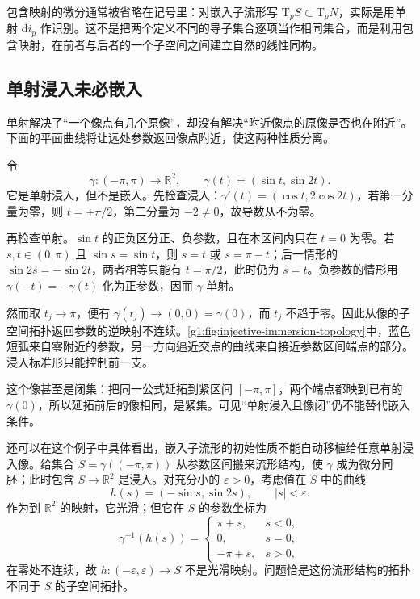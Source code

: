 \ProseParagraphBreak

包含映射的微分通常被省略在记号里：对嵌入子流形写 \(\mathrm{T}_pS\subset \mathrm{T}_pN\)，实际是用单射 \(\mathrm{d}i_p\) 作识别。这不是把两个定义不同的导子集合逐项当作相同集合，而是利用包含映射，在前者与后者的一个子空间之间建立自然的线性同构。

\subsection{单射浸入未必嵌入}
\label{g1:subsec:1104:04}

单射解决了“一个像点有几个原像”，却没有解决“附近像点的原像是否也在附近”。下面的平面曲线将让远处参数返回像点附近，使这两种性质分离。

\begin{example}\label{g1:exm:injective-immersion-not-embedding}
	令
	\[
		\gamma:(-\pi,\pi)\longrightarrow\mathbb R^2,
		\qquad\gamma(t)=(\sin t,\sin2t).
	\]
	它是单射浸入，但不是嵌入。先检查浸入：\(\gamma'(t)=(\cos t,2\cos2t)\)，若第一分量为零，则 \(t=\pm\pi/2\)，第二分量为 \(-2\ne0\)，故导数从不为零。

	再检查单射。\(\sin t\) 的正负区分正、负参数，且在本区间内只在 \(t=0\) 为零。若 \(s,t\in(0,\pi)\) 且 \(\sin s=\sin t\)，则 \(s=t\) 或 \(s=\pi-t\)；后一情形的 \(\sin2s=-\sin2t\)，两者相等只能有 \(t=\pi/2\)，此时仍为 \(s=t\)。负参数的情形用 \(\gamma(-t)=-\gamma(t)\) 化为正参数，因而 \(\gamma\) 单射。

	然而取 \(t_j\to\pi\)，便有 \(\gamma(t_j)\to(0,0)=\gamma(0)\)，而 \(t_j\) 不趋于零。因此从像的子空间拓扑返回参数的逆映射不连续。\cref{g1:fig:injective-immersion-topology}中，蓝色短弧来自零附近的参数，另一方向逼近交点的曲线来自接近参数区间端点的部分。浸入标准形只能控制前一支。

	这个像甚至是闭集：把同一公式延拓到紧区间 \([-\pi,\pi]\)，两个端点都映到已有的 \(\gamma(0)\)，所以延拓前后的像相同，是紧集。可见“单射浸入且像闭”仍不能替代嵌入条件。
\end{example}



还可以在这个例子中具体看出，嵌入子流形的初始性质不能自动移植给任意单射浸入像。给集合 \(S=\gamma((-\pi,\pi))\) 从参数区间搬来流形结构，使 \(\gamma\) 成为微分同胚；此时包含 \(S\to\mathbb R^2\) 是浸入。对充分小的 \(\varepsilon>0\)，考虑值在 \(S\) 中的曲线
\[
	h(s)=(-\sin s,\sin2s),\qquad |s|<\varepsilon.
\]
作为到 \(\mathbb R^2\) 的映射，它光滑；但它在 \(S\) 的参数坐标为
\[
	\gamma^{-1}(h(s))=
	\begin{cases}
		\pi+s,&s<0,\\
		0,&s=0,\\
		-\pi+s,&s>0,
	\end{cases}
\]
在零处不连续，故 \(h:(-\varepsilon,\varepsilon)\to S\) 不是光滑映射。问题恰是这份流形结构的拓扑不同于 \(S\) 的子空间拓扑。

